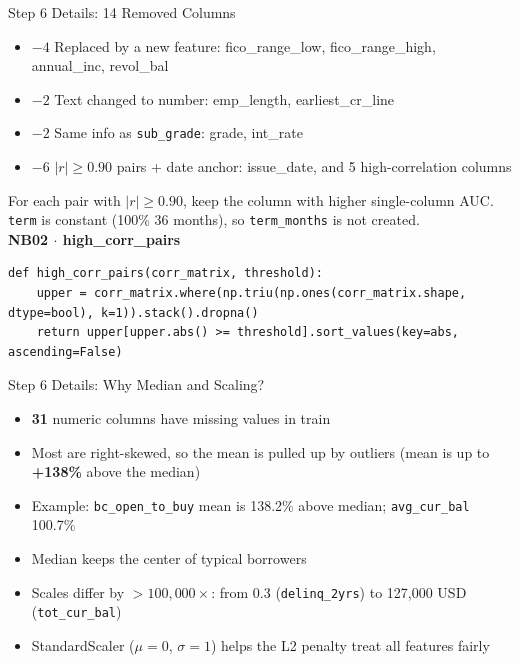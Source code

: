 \documentclass{beamer}
\newcommand{\code}[1]{\texttt{\small #1}}
\begin{document}
\begin{frame}[fragile]{Step 6 Details: 14 Removed Columns}
  \begin{itemize}\small
    \item $-4$ Replaced by a new feature: fico\_range\_low, fico\_range\_high, annual\_inc, revol\_bal
    \item $-2$ Text changed to number: emp\_length, earliest\_cr\_line
    \item $-2$ Same info as \code{sub\_grade}: grade, int\_rate
    \item $-6$ $|r|\ge0.90$ pairs + date anchor: issue\_date, and 5 high-correlation columns
  \end{itemize}
  For each pair with $|r|\ge0.90$, keep the column with higher single-column AUC. \code{term} is constant (100\% 36 months), so \code{term\_months} is not created.\\[0.1cm]
  \textbf{\scriptsize NB02 $\cdot$ high\_corr\_pairs}
\begin{lstlisting}
def high_corr_pairs(corr_matrix, threshold):
    upper = corr_matrix.where(np.triu(np.ones(corr_matrix.shape, dtype=bool), k=1)).stack().dropna()
    return upper[upper.abs() >= threshold].sort_values(key=abs, ascending=False)
\end{lstlisting}
\end{frame}

\begin{frame}{Step 6 Details: Why Median and Scaling?}
  \begin{itemize}
    \item \textbf{31} numeric columns have missing values in train
    \item Most are right-skewed, so the mean is pulled up by outliers (mean is up to \textbf{+138\%} above the median)
    \item Example: \code{bc\_open\_to\_buy} mean is 138.2\% above median; \code{avg\_cur\_bal} 100.7\%
    \item Median keeps the center of typical borrowers
    \item Scales differ by \textbf{$>100{,}000\times$}: from 0.3 (\code{delinq\_2yrs}) to 127,000 USD (\code{tot\_cur\_bal})
    \item StandardScaler ($\mu=0$, $\sigma=1$) helps the L2 penalty treat all features fairly
  \end{itemize}
\end{frame}
\end{document}
